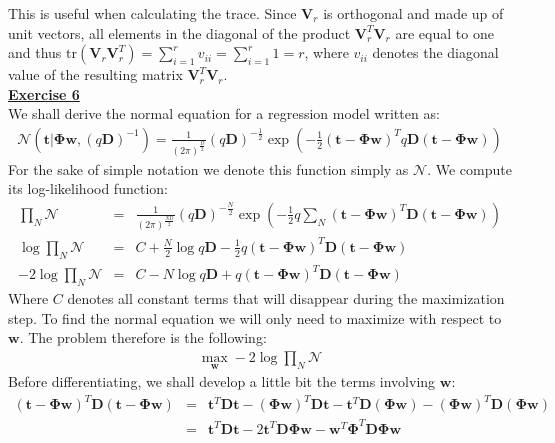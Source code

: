 \documentclass[a4paper, 11pt]{article}
\begin{document}
\newline This is useful when calculating the trace. Since $\mathbf{V}_r$ is orthogonal and made up of unit vectors, all elements in the diagonal of the product $\mathbf{V}_{r}^{T} \mathbf{V}_r$ are equal to one and thus $\text{tr}\left( \mathbf{V}_r \mathbf{V}_{r}^{T} \right) = \sum_{i=1}^r v_{ii} =  \sum_{i=1}^r 1 = r$, where $v_{ii}$ denotes the diagonal value of the resulting matrix $\mathbf{V}_{r}^{T} \mathbf{V}_r$.\\
\newpage
\textbf{\underline{Exercise 6}}\\
\newline We shall derive the normal equation for a regression model written as:
\begin{eqnarray}
\mathcal{N} \left( \mathbf{t} | \mathbf{\Phi} \mathbf{w}, (q \mathbf{D})^{-1} \right) = \frac{1}{(2 \pi)^{\frac{D}{2}}} (q \mathbf{D})^{-\frac{1}{2}} \exp \left( -\frac{1}{2} (\mathbf{t} - \mathbf{\Phi} \mathbf{w} )^{T} q \mathbf{D} (\mathbf{t} - \mathbf{\Phi} \mathbf{w} ) \right) \nonumber
\end{eqnarray}
For the sake of simple notation we denote this function simply as $\mathcal{N}$. We compute its log-likelihood function:
\begin{eqnarray}
\prod_N \mathcal{N} &=& \frac{1}{(2 \pi)^{\frac{ND}{2}}} (q \mathbf{D})^{-\frac{N}{2}} \exp \left( -\frac{1}{2} q \sum_N (\mathbf{t} - \mathbf{\Phi} \mathbf{w} )^{T} \mathbf{D} (\mathbf{t} - \mathbf{\Phi} \mathbf{w} ) \right) \nonumber \\
\log \prod_N \mathcal{N} &=& C + \frac{N}{2} \log q \mathbf{D} -\frac{1}{2} q (\mathbf{t} - \mathbf{\Phi} \mathbf{w} )^{T} \mathbf{D} (\mathbf{t} - \mathbf{\Phi} \mathbf{w} ) \nonumber \\
-2 \log \prod_N \mathcal{N} &=& C - N \log q \mathbf{D} + q (\mathbf{t} - \mathbf{\Phi} \mathbf{w} )^{T} \mathbf{D} (\mathbf{t} - \mathbf{\Phi} \mathbf{w} ) \nonumber 
\end{eqnarray}
Where $C$ denotes all constant terms that will disappear during the maximization step. To find the normal equation we will only need to maximize with respect to $\mathbf{w}$. The problem therefore is the following:
\begin{eqnarray}
\max_{\mathbf{w}} -2 \log \prod_N \mathcal{N}  \nonumber
\end{eqnarray}
Before differentiating, we shall develop a little bit the terms involving $\mathbf{w}$:
\begin{eqnarray}
(\mathbf{t} - \mathbf{\Phi} \mathbf{w} )^{T} \mathbf{D} (\mathbf{t} - \mathbf{\Phi} \mathbf{w} ) &=& \mathbf{t}^T \mathbf{D} \mathbf{t} - \left( \mathbf{\Phi} \mathbf{w} \right)^{T} \mathbf{D} \mathbf{t} - \mathbf{t}^T \mathbf{D} \left( \mathbf{\Phi} \mathbf{w} \right) - \left( \mathbf{\Phi} \mathbf{w} \right)^T \mathbf{D} \left( \mathbf{\Phi} \mathbf{w} \right) \nonumber \\
&=& \mathbf{t}^T \mathbf{D} \mathbf{t} - 2 \mathbf{t}^T \mathbf{D} \mathbf{\Phi} \mathbf{w} - \mathbf{w}^T \mathbf{\Phi}^T \mathbf{D} \mathbf{\Phi} \mathbf{w} \nonumber
\end{eqnarray}
\end{document}
